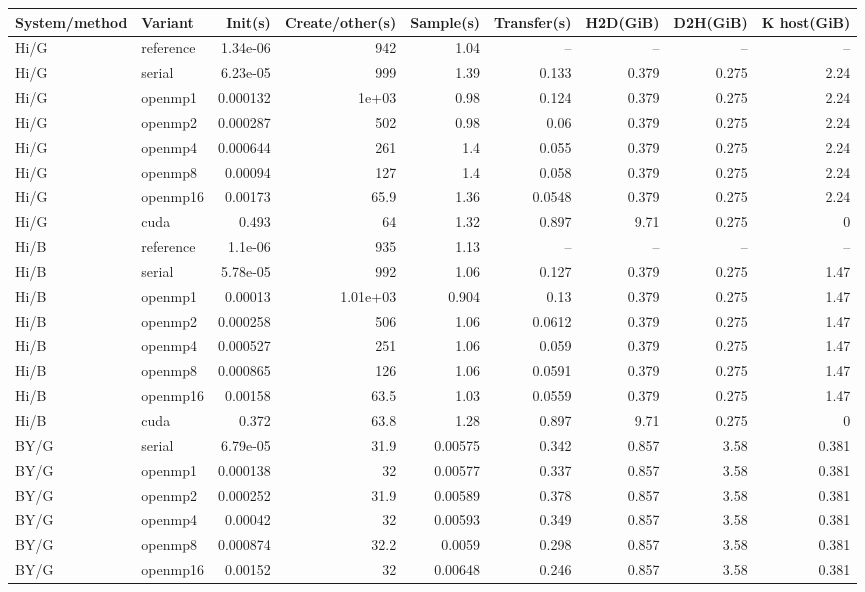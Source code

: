 \documentclass[11pt]{article}
\begin{document}
\scriptsize\begin{longtable}{llrrrrrrr}
\toprule System/method & Variant & Init(s) & Create/other(s) & Sample(s) & Transfer(s) & H2D(GiB) & D2H(GiB) & K host(GiB)\\
\midrule\endhead
Hi/G & reference & 1.34e-06 & 942 & 1.04 & -- & -- & -- & --\\
Hi/G & serial & 6.23e-05 & 999 & 1.39 & 0.133 & 0.379 & 0.275 & 2.24\\
Hi/G & openmp1 & 0.000132 & 1e+03 & 0.98 & 0.124 & 0.379 & 0.275 & 2.24\\
Hi/G & openmp2 & 0.000287 & 502 & 0.98 & 0.06 & 0.379 & 0.275 & 2.24\\
Hi/G & openmp4 & 0.000644 & 261 & 1.4 & 0.055 & 0.379 & 0.275 & 2.24\\
Hi/G & openmp8 & 0.00094 & 127 & 1.4 & 0.058 & 0.379 & 0.275 & 2.24\\
Hi/G & openmp16 & 0.00173 & 65.9 & 1.36 & 0.0548 & 0.379 & 0.275 & 2.24\\
Hi/G & cuda & 0.493 & 64 & 1.32 & 0.897 & 9.71 & 0.275 & 0\\
Hi/B & reference & 1.1e-06 & 935 & 1.13 & -- & -- & -- & --\\
Hi/B & serial & 5.78e-05 & 992 & 1.06 & 0.127 & 0.379 & 0.275 & 1.47\\
Hi/B & openmp1 & 0.00013 & 1.01e+03 & 0.904 & 0.13 & 0.379 & 0.275 & 1.47\\
Hi/B & openmp2 & 0.000258 & 506 & 1.06 & 0.0612 & 0.379 & 0.275 & 1.47\\
Hi/B & openmp4 & 0.000527 & 251 & 1.06 & 0.059 & 0.379 & 0.275 & 1.47\\
Hi/B & openmp8 & 0.000865 & 126 & 1.06 & 0.0591 & 0.379 & 0.275 & 1.47\\
Hi/B & openmp16 & 0.00158 & 63.5 & 1.03 & 0.0559 & 0.379 & 0.275 & 1.47\\
Hi/B & cuda & 0.372 & 63.8 & 1.28 & 0.897 & 9.71 & 0.275 & 0\\
BY/G & serial & 6.79e-05 & 31.9 & 0.00575 & 0.342 & 0.857 & 3.58 & 0.381\\
BY/G & openmp1 & 0.000138 & 32 & 0.00577 & 0.337 & 0.857 & 3.58 & 0.381\\
BY/G & openmp2 & 0.000252 & 31.9 & 0.00589 & 0.378 & 0.857 & 3.58 & 0.381\\
BY/G & openmp4 & 0.00042 & 32 & 0.00593 & 0.349 & 0.857 & 3.58 & 0.381\\
BY/G & openmp8 & 0.000874 & 32.2 & 0.0059 & 0.298 & 0.857 & 3.58 & 0.381\\
BY/G & openmp16 & 0.00152 & 32 & 0.00648 & 0.246 & 0.857 & 3.58 & 0.381\\

\end{longtable}
\end{document}
